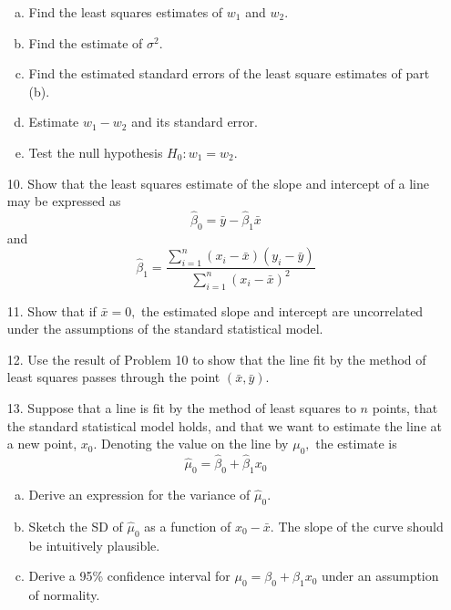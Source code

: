 \documentclass{article}
\begin{document}
\begin{itemize}
\begin{enumerate}[a.]
			\item Find the least squares estimates of $w_1$ and $w_2.$

			\item Find the estimate of $\sigma^2.$

			\item Find the estimated standard errors of the least square estimates of part (b).

			\item Estimate $w_1-w_2$ and its standard error.

			\item Test the null hypothesis $H_0: w_1=w_2.$
				
		\end{enumerate}

	\item[10.] Show that the least squares estimate of the slope and intercept of a line may be expressed as \[\hat\beta_0=\bar y-\hat\beta_1\bar x\] and \[\hat\beta_1=\frac{\displaystyle \sum_{i=1}^{n} (x_i-\bar x)(y_i-\bar y)}{\displaystyle \sum_{i=1}^{n} (x_i-\bar x)^2}\]

	\item[11.] Show that if $\bar x=0,$ the estimated slope and intercept are uncorrelated under the assumptions of the standard statistical model.

	\item[12.] Use the result of Problem 10 to show that the line fit by the method of least squares passes through the point $(\bar x, \bar y).$

	\item[13.] Suppose that a line is fit by the method of least squares to $n$ points, that the standard statistical model holds, and that we want to estimate the line at a new point, $x_0.$ Denoting the value on the line by $\mu_0,$ the estimate is \[\hat\mu_0=\hat\beta_0+\hat\beta_1x_0\] 
		\begin{enumerate}[a.]
			\item Derive an expression for the variance of $\hat\mu_0.$

			\item Sketch the SD of $\hat\mu_0$ as a function of $x_0-\bar x.$ The slope of the curve should be intuitively plausible.

			\item Derive a 95\% confidence interval for $\mu_0=\beta_0+\beta_1x_0$ under an assumption of normality.
				
		\end{enumerate}
			

\end{itemize}
\end{document}
